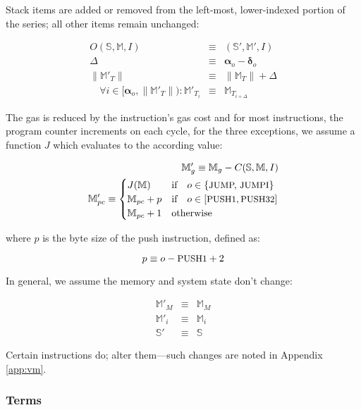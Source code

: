 \documentclass[9pt,oneside]{amsart}
\begin{document}
\begin{multicols}{2}
Stack items are added or removed from the left-most, lower-indexed portion of the series; all other items remain unchanged:

\begin{eqnarray}
O(\mathbb{S}, \mathbb{M}, I) & \equiv & (\mathbb{S}', \mathbb{M}', I) \\
\Delta & \equiv & \mathbf{\alpha}_o - \mathbf{\delta}_o \\
\lVert\mathbb{M}'_{T}\rVert & \equiv & \lVert\mathbb{M}_{T}\rVert + \Delta \\
\quad \forall i \in [\mathbf{\alpha}_o, \lVert\mathbb{M}'_T\rVert): \mathbb{M}'_{T_i} & \equiv & \mathbb{M}_{T_{i+\Delta}}
\end{eqnarray}

The gas is reduced by the instruction's gas cost and for most instructions, the program counter increments on each cycle, for the three exceptions, we assume a function $J$ which evaluates to the according value:

\begin{eqnarray}
\mathbb{M}'_{g} \equiv \mathbb{M}_{g} - C(\mathbb{S}, \mathbb{M}, I) \\
\mathbb{M}'_{pc} \equiv \begin{cases}
J(\mathbb{M}) & \text{if} \quad o \in \{ \text{\small JUMP, JUMPI} \} \\
\mathbb{M}_{pc} + p & \text{if} \quad o \in [\text{\small PUSH1}, \text{\small PUSH32}] \\
\mathbb{M}_{pc} + 1 & \text{otherwise}
\end{cases}
\end{eqnarray}

where $p$ is the byte size of the push instruction, defined as:

\begin{equation}
p \equiv o - \text{\small PUSH1} + 2
\end{equation}

In general, we assume the memory and system state don't change:

\begin{eqnarray}
\mathbb{M}'_M & \equiv & \mathbb{M}_M \\
\mathbb{M}'_i & \equiv & \mathbb{M}_i \\
\mathbb{S}' & \equiv & \mathbb{S}
\end{eqnarray}

Certain instructions do; alter them---such changes are noted in Appendix \ref{app:vm}.

\subsubsection{Terms}


\end{multicols}
\end{document}
